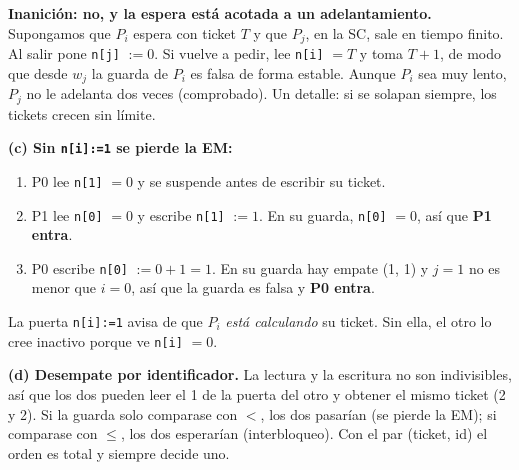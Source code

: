 \begin{solucion}
\textbf{Inanición: no, y la espera está acotada a un adelantamiento.} Supongamos que $P_i$ espera con ticket $T$ y
que $P_j$, en la SC, sale en tiempo finito. Al salir pone \texttt{n[j]} $:= 0$. Si vuelve a pedir, lee
\texttt{n[i]} $= T$ y toma $T + 1$, de modo que desde $w_j$ la guarda de $P_i$ es falsa de forma estable. Aunque
$P_i$ sea muy lento, $P_j$ no le adelanta dos veces (comprobado). Un detalle: si se solapan siempre, los tickets
crecen sin límite.

\textbf{(c) Sin \texttt{n[i]:=1} se pierde la EM:}
\begin{enumerate}[leftmargin=*,noitemsep]
  \item P0 lee \texttt{n[1]} $= 0$ y se suspende antes de escribir su ticket.
  \item P1 lee \texttt{n[0]} $= 0$ y escribe \texttt{n[1]} $:= 1$. En su guarda, \texttt{n[0]} $= 0$, así que
        \textbf{P1 entra}.
  \item P0 escribe \texttt{n[0]} $:= 0 + 1 = 1$. En su guarda hay empate (1, 1) y $j = 1$ no es menor que $i = 0$,
        así que la guarda es falsa y \textbf{P0 entra}.
\end{enumerate}
La puerta \texttt{n[i]:=1} avisa de que $P_i$ \emph{está calculando} su ticket. Sin ella, el otro lo cree inactivo
porque ve \texttt{n[i]} $= 0$.

\textbf{(d) Desempate por identificador.} La lectura y la escritura no son indivisibles, así que los dos pueden
leer el 1 de la puerta del otro y obtener el mismo ticket (2 y 2). Si la guarda solo comparase con $<$, los dos
pasarían (se pierde la EM); si comparase con $\le$, los dos esperarían (interbloqueo). Con el par (ticket, id) el
orden es total y siempre decide uno.
\end{solucion}

